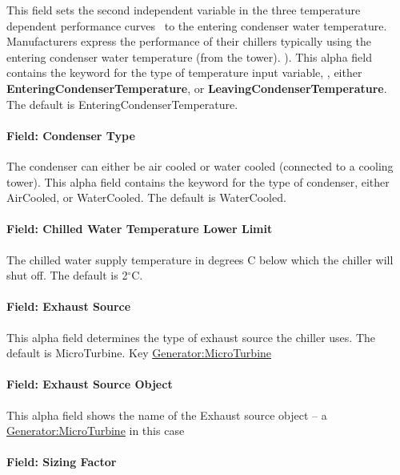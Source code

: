 This field sets the second independent variable in the three temperature dependent performance curves~ to the entering condenser water temperature. Manufacturers express the performance of their chillers typically using the entering condenser water temperature (from the tower). ). This alpha field contains the keyword for the type of temperature input variable, , either \textbf{EnteringCondenserTemperature}, or \textbf{LeavingCondenserTemperature}. The default is EnteringCondenserTemperature.

\paragraph{Field: Condenser Type}\label{field-condenser-type-6}

The condenser can either be air cooled or water cooled (connected to a cooling tower). This alpha field contains the keyword for the type of condenser, either AirCooled, or WaterCooled. The default is WaterCooled.

\paragraph{Field: Chilled Water Temperature Lower Limit}\label{field-chilled-water-temperature-lower-limit-1}

The chilled water supply temperature in degrees C below which the chiller will shut off. The default is 2$^\circ$C.

\paragraph{Field: Exhaust Source}\label{field-exhaust-source}

This alpha field determines the type of exhaust source the chiller uses. The default is MicroTurbine. Key \hyperref[generatormicroturbine]{Generator:MicroTurbine}

\paragraph{Field: Exhaust Source Object}\label{field-exhaust-source-object}

This alpha field shows the name of the Exhaust source object -- a \hyperref[generatormicroturbine]{Generator:MicroTurbine} in this case

\paragraph{Field: Sizing Factor}\label{field-sizing-factor-9}

